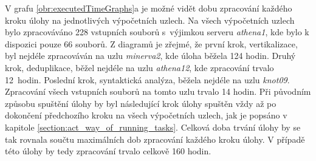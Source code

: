 V grafu \ref{obr:executedTimeGraphs}a je možné vidět dobu zpracování každého kroku úlohy na jednotlivých výpočetních uzlech. Na všech výpočetních uzlech bylo zpracováváno 228 vstupních souborů s~výjimkou serveru \textit{athena1}, kde bylo k dispozici pouze 66 souborů. Z diagramů je zřejmé, že první krok, vertikalizace, byl nejdéle zpracováván na uzlu \textit{minerva2}, kde úloha běžela 124 hodin. Druhý krok, deduplikace, běžel nejdéle na uzlu \textit{athena12}, kde zpracování trvalo 12~hodin. Poslední krok, syntaktická analýza, běžela nejdéle na uzlu \textit{knot09}. Zpracování všech vstupních souborů na tomto uzlu trvalo 14 hodin. Při původním způsobu spuštění úlohy by byl následující krok úlohy spuštěn vždy až po dokončení předchozího kroku na všech výpočetních uzlech, jak je popsáno v kapitole \ref{section:act_way_of_running_tasks}. Celková doba trvání úlohy by se tak rovnala součtu maximálních dob zpracování každého kroku úlohy. V případě této úlohy by tedy zpracování trvalo celkově 160 hodin.

